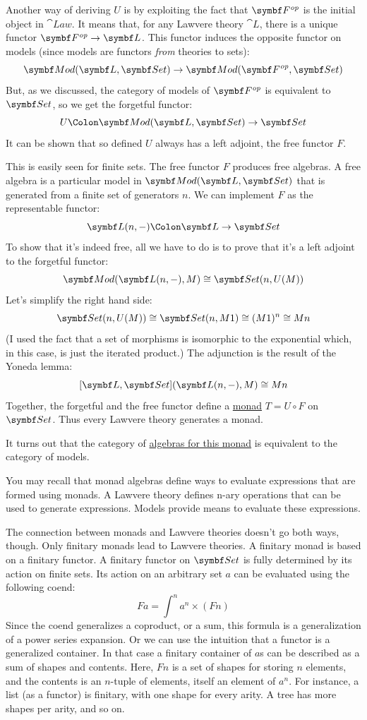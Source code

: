 Another way of deriving $U$ is by exploiting the fact that
$\Fop$ is the initial object in $\cat{Law}$. It
means that, for any Lawvere theory $\cat{L}$, there is a unique
functor $\Fop \to \cat{L}$. This functor induces the
opposite functor on models (since models are functors \emph{from}
theories to sets):
\[\cat{Mod}(\cat{L}, \Set) \to \cat{Mod}(\Fop, \Set)\]
But, as we discussed, the category of models of
$\Fop$ is equivalent to $\Set$, so we get
the forgetful functor:
\[U \Colon \cat{Mod}(\cat{L}, \Set) \to \Set\]
It can be shown that so defined $U$ always has a left adjoint,
the free functor $F$.

This is easily seen for finite sets. The free functor $F$
produces free algebras. A free algebra is a particular model in
$\cat{Mod}(\cat{L}, \Set)$ that is generated from a finite set of generators
$n$. We can implement $F$ as the representable functor:
\[\cat{L}(n, -) \Colon \cat{L} \to \Set\]
To show that it's indeed free, all we have to do is to prove that it's a
left adjoint to the forgetful functor:
\[\cat{Mod}(\cat{L}(n, -), M) \cong \Set(n, U(M))\]
Let's simplify the right hand side:
\[\Set(n, U(M)) \cong \Set(n, M 1) \cong (M 1)^n \cong M n\]
(I used the fact that a set of morphisms is isomorphic to the
exponential which, in this case, is just the iterated product.) The
adjunction is the result of the Yoneda lemma:
\[[\cat{L}, \Set](\cat{L}(n, -), M) \cong M n\]
Together, the forgetful and the free functor define a
\hyperref[monads-categorically]{monad}
$T = U \circ F$ on $\Set$. Thus every Lawvere theory generates
a monad.

It turns out that the category of
\hyperref[algebras-for-monads]{algebras
  for this monad} is equivalent to the category of models.

You may recall that monad algebras define ways to evaluate expressions
that are formed using monads. A Lawvere theory defines n-ary operations
that can be used to generate expressions. Models provide means to
evaluate these expressions.

The connection between monads and Lawvere theories doesn't go both ways,
though. Only finitary monads lead to Lawvere theories. A finitary monad
is based on a finitary functor. A finitary functor on $\Set$ is
fully determined by its action on finite sets. Its action on an
arbitrary set $a$ can be evaluated using the following coend:
\[F a = \int^n a^n \times (F n)\]
Since the coend generalizes a coproduct, or a sum, this formula is a
generalization of a power series expansion. Or we can use the intuition
that a functor is a generalized container. In that case a finitary
container of $a$s can be described as a sum of shapes and
contents. Here, $F n$ is a set of shapes for storing $n$ elements,
and the contents is an $n$-tuple of elements, itself an element of
$a^n$. For instance, a list (as a functor) is finitary, with one
shape for every arity. A tree has more shapes per arity, and so on.

